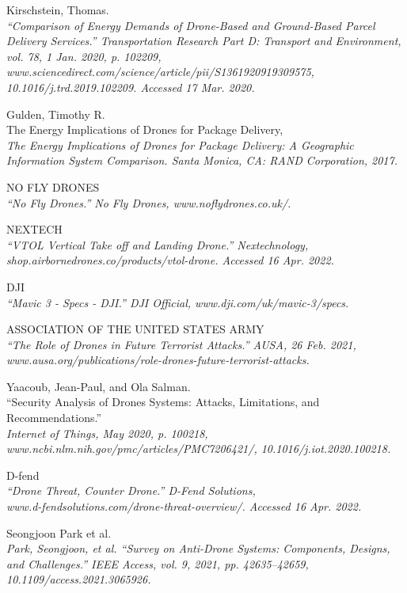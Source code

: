 \begin{thebibliography}{9}
Kirschstein, Thomas. \\
\textit{“Comparison of Energy Demands of Drone-Based and Ground-Based Parcel Delivery Services.” Transportation Research Part D: Transport and Environment, vol. 78, 1 Jan. 2020, p. 102209, www.sciencedirect.com/science/article/pii/S1361920919309575, 10.1016/j.trd.2019.102209. Accessed 17 Mar. 2020.} 

Gulden, Timothy R.\\
The Energy Implications of Drones for Package Delivery,\\ 
\textit{The Energy Implications of Drones for Package Delivery: A Geographic Information System Comparison. Santa Monica, CA: RAND Corporation, 2017.}

NO FLY DRONES\\
\textit{“No Fly Drones.” No Fly Drones, www.noflydrones.co.uk/.} 

NEXTECH\\
\textit{“VTOL Vertical Take off and Landing Drone.” Nextechnology,\\ shop.airbornedrones.co/products/vtol-drone. Accessed 16 Apr. 2022.}

DJI\\
\textit{“Mavic 3 - Specs - DJI.” DJI Official, www.dji.com/uk/mavic-3/specs.} 

ASSOCIATION OF THE UNITED STATES ARMY\\
\textit{“The Role of Drones in Future Terrorist Attacks.” AUSA, 26 Feb. 2021,\\ www.ausa.org/publications/role-drones-future-terrorist-attacks.} 

Yaacoub, Jean-Paul, and Ola Salman.\\
 “Security Analysis of Drones Systems: Attacks, Limitations, and Recommendations.”\\
\textit{Internet of Things, May 2020, p. 100218,\\ www.ncbi.nlm.nih.gov/pmc/articles/PMC7206421/, 10.1016/j.iot.2020.100218.}

D-fend\\
\textit{“Drone Threat, Counter Drone.” D-Fend Solutions,\\ www.d-fendsolutions.com/drone-threat-overview/. Accessed 16 Apr. 2022.}

Seongjoon Park et al.\\
\textit{Park, Seongjoon, et al. “Survey on Anti-Drone Systems: Components, Designs, and Challenges.” IEEE Access, vol. 9, 2021, pp. 42635–42659, 10.1109/access.2021.3065926.}


\end{thebibliography}
